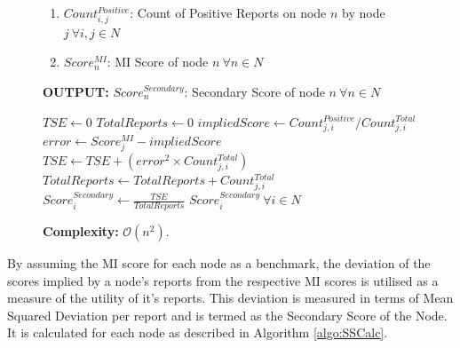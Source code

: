 \documentclass[journal]{IEEEtran}
\begin{document}
\begin{figure}[!t]
\begin{algorithm}[H]
\begin{enumerate}
		\item $Count^{Positive}_{i,j}$: Count of Positive Reports on node $ n $ by node $ j \ \forall i,j\in N $
		\item $Score^{MI}_n$: MI Score of node $n\ \forall n\in N$
	\end{enumerate}
	\textbf{OUTPUT:} $Score^{Secondary}_n$: Secondary Score of node $n\ \forall n\in N$
	\begin{algorithmic}
			\STATE $TSE \leftarrow 0$
			\STATE $ TotalReports \leftarrow 0 $
				\STATE $impliedScore \leftarrow Count^{Positive}_{j,i} / Count^{Total}_{j,i}$
				\STATE $ error \leftarrow Score^{MI}_j - impliedScore$
				\STATE $ TSE \leftarrow TSE + (error^2\times Count^{Total}_{j,i})$
				\STATE $ TotalReports \leftarrow TotalReports + Count^{Total}_{j,i}$
			\ENDFOR
			\STATE $ Score^{Secondary}_i \leftarrow \frac{TSE}{TotalReports}$
		\ENDFOR
		\RETURN $Score^{Secondary}_i\ \forall i\in N$ 
	\end{algorithmic}
	\textbf{Complexity:} $\mathcal{O}(n^2)$.
\end{algorithm}
\end{figure}
By assuming the MI score for each node as a benchmark, the deviation of the scores implied by a node's reports from the respective MI scores is utilised as a measure of the utility of it's reports. This deviation is measured in terms of Mean Squared Deviation per report and is termed as the Secondary Score of the Node. It is calculated for each node as described in %
Algorithm \ref{algo:SSCalc}.
\end{document}
